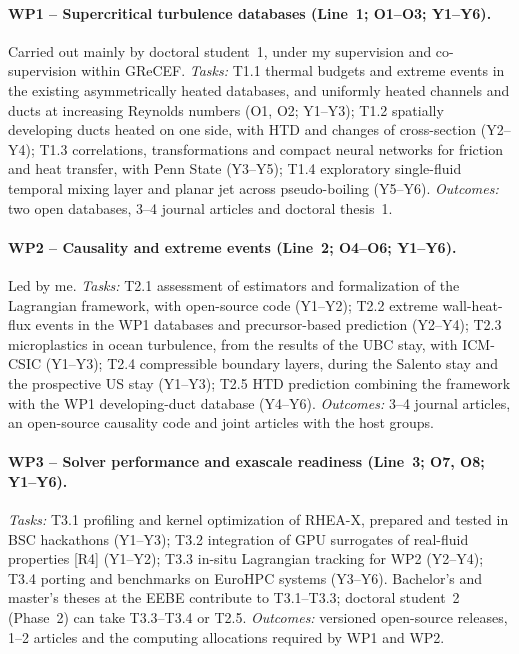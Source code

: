 \documentclass[11pt]{article}
\begin{document}
\paragraph{WP1 -- Supercritical turbulence databases (Line~1; O1--O3; Y1--Y6).} Carried out
mainly by doctoral student~1, under my supervision and co-supervision within GReCEF.
\emph{Tasks:} T1.1 thermal budgets and extreme events in the existing asymmetrically heated
databases, and uniformly heated channels and ducts at increasing Reynolds numbers (O1, O2;
Y1--Y3); T1.2 spatially developing ducts heated on one side, with HTD and changes of cross-section (Y2--Y4); T1.3 correlations, transformations
and compact neural networks for friction and heat transfer, with Penn State (Y3--Y5); T1.4
exploratory single-fluid temporal mixing layer and planar jet across pseudo-boiling (Y5--Y6).
\emph{Outcomes:} two open databases, 3--4 journal articles and doctoral thesis~1.

\paragraph{WP2 -- Causality and extreme events (Line~2; O4--O6; Y1--Y6).} Led by me.
\emph{Tasks:} T2.1 assessment of estimators and formalization of the Lagrangian framework,
with open-source code (Y1--Y2); T2.2 extreme wall-heat-flux events in the WP1 databases and
precursor-based prediction (Y2--Y4); T2.3 microplastics in ocean turbulence, from the results
of the UBC stay, with ICM-CSIC (Y1--Y3); T2.4 compressible boundary layers, during the
Salento stay and the prospective US stay (Y1--Y3); T2.5 HTD prediction combining the
framework with the WP1 developing-duct database (Y4--Y6).
\emph{Outcomes:} 3--4 journal articles, an open-source causality code and joint articles with
the host groups.

\paragraph{WP3 -- Solver performance and exascale readiness (Line~3; O7, O8; Y1--Y6).}
\emph{Tasks:} T3.1 profiling and kernel optimization of RHEA-X, prepared and tested in BSC
hackathons (Y1--Y3); T3.2 integration of GPU surrogates of real-fluid properties [R4] (Y1--Y2);
T3.3 in-situ Lagrangian tracking for WP2 (Y2--Y4); T3.4 porting and benchmarks on EuroHPC
systems (Y3--Y6). Bachelor's and master's theses at the EEBE contribute to T3.1--T3.3;
doctoral student~2 (Phase~2) can take T3.3--T3.4 or T2.5.
\emph{Outcomes:} versioned open-source releases, 1--2 articles and the computing allocations
required by WP1 and WP2.
\end{document}
